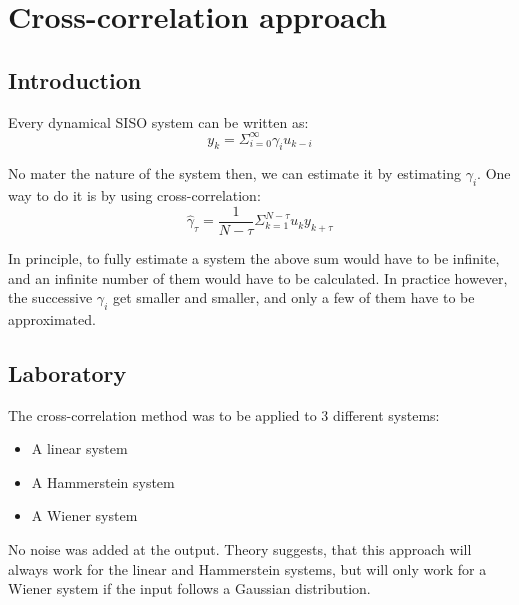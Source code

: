 \chapter{Cross-correlation approach}


\section{Introduction}
Every dynamical SISO system can be written as:
\begin{equation}
    y_k = \Sigma_{i=0}^{\infty}\gamma_iu_{k-i}
\end{equation}

No mater the nature of the system then, we can estimate it by estimating $\gamma_i$.
One way to do it is by using cross-correlation:
 \begin{equation}
     \hat{\gamma}_\tau = \frac{1}{N-\tau}\Sigma^{N-\tau}_{k=1}u_ky_{k+\tau}
\end{equation}

In principle, to fully estimate a system the above sum would have to be infinite, and an infinite number of
them would have to be calculated.
In practice however, the successive $\gamma_i$ get smaller and smaller, and only a few of them have to be approximated.

\clearpage
\section{Laboratory}
The cross-correlation method was to be applied to 3 different systems:
\begin{itemize}
        \item A linear system
        \item A Hammerstein system
        \item A Wiener system
\end{itemize}
No noise was added at the output.
Theory suggests, that this approach will always work for the linear and Hammerstein systems, but will only work for a Wiener system if the input follows a 
Gaussian distribution.

